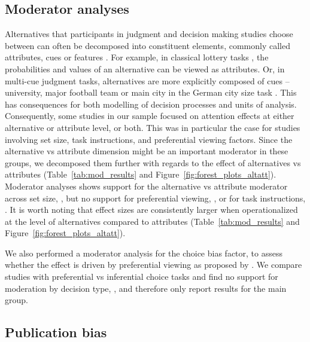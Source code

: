 \subsection{Moderator analyses}

Alternatives that participants in judgment and decision making studies choose between can often be decomposed into constituent elements, commonly called attributes, cues or features \citep{payne1988,tversky1972elimination,stojic2020s,gigerenzer1996reasoning,schulz2018putting,hogarth2007heuristic}. For example, in classical lottery tasks \citep{tversky1979}, the probabilities and values of an alternative can be viewed as attributes. Or, in multi-cue judgment tasks, alternatives are more explicitly composed of cues -- university, major football team or main city in the German city size task \citep{gigerenzer1996reasoning}. This has consequences for both modelling of decision processes and units of analysis. Consequently, some studies in our sample focused on attention effects at either alternative or attribute level, or both. This was in particular the case for studies involving set size, task instructions, and preferential viewing factors. Since the alternative vs attribute dimension might be an important moderator in these groups, we decomposed them further with regards to the effect of alternatives vs attributes (Table~\ref{tab:mod_results} and Figure~\ref{fig:forest_plots_altatt}). Moderator analyses shows support for the alternative vs attribute moderator across set size, , but no support for preferential viewing, , or for task instructions, . It is worth noting that effect sizes are consistently larger when operationalized at the level of alternatives compared to attributes (Table~\ref{tab:mod_results} and Figure~\ref{fig:forest_plots_altatt}). 

We also performed a moderator analysis for the choice bias factor, to assess whether the effect is driven by preferential viewing as proposed by \cite{shimojo2003a}. We compare studies with preferential vs inferential choice tasks and find no support for moderation by decision type, , and therefore only report results for the main group. 



\subsection{Publication bias}

